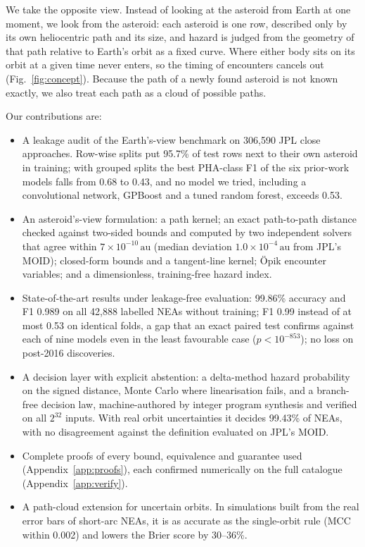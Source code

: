 \documentclass[conference]{IEEEtran}
\newcommand{\au}{\,\mathrm{au}}
\begin{document}
We take the opposite view. Instead of looking at the asteroid from Earth at one moment, we look from the asteroid: each asteroid is one row, described only by its own heliocentric path and its size, and hazard is judged from the geometry of that path relative to Earth's orbit as a fixed curve. Where either body sits on its orbit at a given time never enters, so the timing of encounters cancels out (Fig.~\ref{fig:concept}). Because the path of a newly found asteroid is not known exactly, we also treat each path as a cloud of possible paths.

Our contributions are:
\begin{itemize}
\item A leakage audit of the Earth's-view benchmark on 306,590 JPL close approaches. Row-wise splits put 95.7\% of test rows next to their own asteroid in training; with grouped splits the best PHA-class F1 of the six prior-work models falls from 0.68 to 0.43, and no model we tried, including a convolutional network, GPBoost and a tuned random forest, exceeds 0.53.
\item An asteroid's-view formulation: a path kernel; an exact path-to-path distance checked against two-sided bounds and computed by two independent solvers that agree within $7\times10^{-10}\au$ (median deviation $1.0\times10^{-4}\au$ from JPL's MOID); closed-form bounds and a tangent-line kernel; Öpik encounter variables; and a dimensionless, training-free hazard index.
\item State-of-the-art results under leakage-free evaluation: 99.86\% accuracy and F1 0.989 on all 42,888 labelled NEAs without training; F1 0.99 instead of at most 0.53 on identical folds, a gap that an exact paired test confirms against each of nine models even in the least favourable case ($p<10^{-853}$); no loss on post-2016 discoveries.
\item A decision layer with explicit abstention: a delta-method hazard probability on the signed distance, Monte Carlo where linearisation fails, and a branch-free decision law, machine-authored by integer program synthesis and verified on all $2^{32}$ inputs. With real orbit uncertainties it decides 99.43\% of NEAs, with no disagreement against the definition evaluated on JPL's MOID.
\item Complete proofs of every bound, equivalence and guarantee used (Appendix~\ref{app:proofs}), each confirmed numerically on the full catalogue (Appendix~\ref{app:verify}).
\item A path-cloud extension for uncertain orbits. In simulations built from the real error bars of short-arc NEAs, it is as accurate as the single-orbit rule (MCC within 0.002) and lowers the Brier score by 30--36\%.
\end{itemize}
\end{document}
